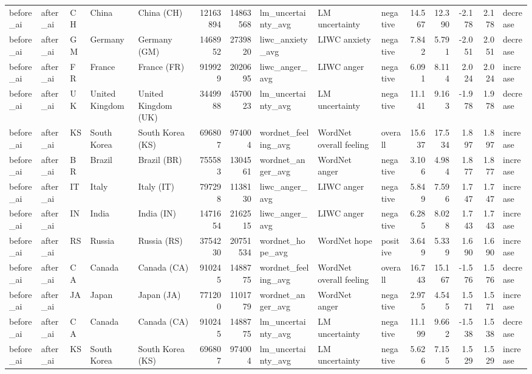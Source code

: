 \begin{tabular}{lllllrrlllrrrrl}
before\_ai & after\_ai & CH & China & China (CH) & 12163894 & 14863568 & lm\_uncertainty\_avg & LM uncertainty & negative & 14.567 & 12.390 & -2.178 & 2.178 & decrease \\
before\_ai & after\_ai & GM & Germany & Germany (GM) & 1468952 & 2739820 & liwc\_anxiety\_avg & LIWC anxiety & negative & 7.842 & 5.791 & -2.051 & 2.051 & decrease \\
before\_ai & after\_ai & FR & France & France (FR) & 919929 & 2020695 & liwc\_anger\_avg & LIWC anger & negative & 6.091 & 8.114 & 2.024 & 2.024 & increase \\
before\_ai & after\_ai & UK & United Kingdom & United Kingdom (UK) & 3449988 & 4570023 & lm\_uncertainty\_avg & LM uncertainty & negative & 11.141 & 9.163 & -1.978 & 1.978 & decrease \\
before\_ai & after\_ai & KS & South Korea & South Korea (KS) & 696807 & 974004 & wordnet\_feeling\_avg & WordNet overall feeling & overall & 15.637 & 17.534 & 1.897 & 1.897 & increase \\
before\_ai & after\_ai & BR & Brazil & Brazil (BR) & 755583 & 1304561 & wordnet\_anger\_avg & WordNet anger & negative & 3.106 & 4.984 & 1.877 & 1.877 & increase \\
before\_ai & after\_ai & IT & Italy & Italy (IT) & 797298 & 1138130 & liwc\_anger\_avg & LIWC anger & negative & 5.849 & 7.596 & 1.747 & 1.747 & increase \\
before\_ai & after\_ai & IN & India & India (IN) & 1471654 & 2162515 & liwc\_anger\_avg & LIWC anger & negative & 6.285 & 8.028 & 1.743 & 1.743 & increase \\
before\_ai & after\_ai & RS & Russia & Russia (RS) & 3754230 & 20751534 & wordnet\_hope\_avg & WordNet hope & positive & 3.649 & 5.339 & 1.690 & 1.690 & increase \\
before\_ai & after\_ai & CA & Canada & Canada (CA) & 910245 & 1488775 & wordnet\_feeling\_avg & WordNet overall feeling & overall & 16.743 & 15.167 & -1.576 & 1.576 & decrease \\
before\_ai & after\_ai & JA & Japan & Japan (JA) & 771200 & 1101779 & wordnet\_anger\_avg & WordNet anger & negative & 2.975 & 4.545 & 1.571 & 1.571 & increase \\
before\_ai & after\_ai & CA & Canada & Canada (CA) & 910245 & 1488775 & lm\_uncertainty\_avg & LM uncertainty & negative & 11.199 & 9.662 & -1.538 & 1.538 & decrease \\
before\_ai & after\_ai & KS & South Korea & South Korea (KS) & 696807 & 974004 & lm\_uncertainty\_avg & LM uncertainty & negative & 5.626 & 7.155 & 1.529 & 1.529 & increase \\

\end{tabular}
